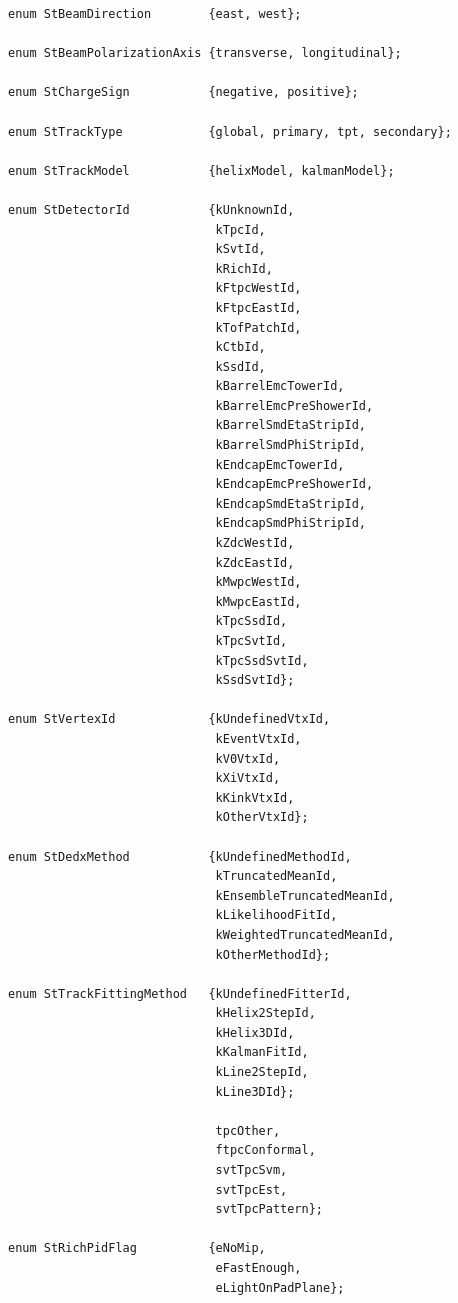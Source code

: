 \documentclass[twoside]{article}
\begin{document}
\begin{verbatim}
enum StBeamDirection        {east, west};

enum StBeamPolarizationAxis {transverse, longitudinal};

enum StChargeSign           {negative, positive};

enum StTrackType            {global, primary, tpt, secondary};

enum StTrackModel           {helixModel, kalmanModel};

enum StDetectorId           {kUnknownId,
                             kTpcId,
                             kSvtId,
                             kRichId,
                             kFtpcWestId,
                             kFtpcEastId,
                             kTofPatchId,
                             kCtbId,
                             kSsdId,
                             kBarrelEmcTowerId,
                             kBarrelEmcPreShowerId,
                             kBarrelSmdEtaStripId,
                             kBarrelSmdPhiStripId,
                             kEndcapEmcTowerId,
                             kEndcapEmcPreShowerId,
                             kEndcapSmdEtaStripId,
                             kEndcapSmdPhiStripId,
                             kZdcWestId,
                             kZdcEastId,
                             kMwpcWestId,
                             kMwpcEastId,
                             kTpcSsdId,
                             kTpcSvtId,
                             kTpcSsdSvtId,
                             kSsdSvtId};

enum StVertexId             {kUndefinedVtxId,
                             kEventVtxId,
                             kV0VtxId,
                             kXiVtxId,
                             kKinkVtxId,
                             kOtherVtxId};

enum StDedxMethod           {kUndefinedMethodId,
                             kTruncatedMeanId,
                             kEnsembleTruncatedMeanId,
                             kLikelihoodFitId,
                             kWeightedTruncatedMeanId,
                             kOtherMethodId};
           
enum StTrackFittingMethod   {kUndefinedFitterId,
                             kHelix2StepId,
                             kHelix3DId,
                             kKalmanFitId,
                             kLine2StepId,
                             kLine3DId};

                             tpcOther,
                             ftpcConformal,
                             svtTpcSvm,
                             svtTpcEst,
                             svtTpcPattern};

enum StRichPidFlag          {eNoMip,
                             eFastEnough,
                             eLightOnPadPlane};
\end{verbatim}
\end{document}
